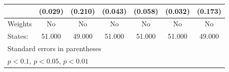{\begin{tabular}{l*{6}{c}}
            &     (0.029)         &     (0.210)         &     (0.043)         &     (0.058)         &     (0.032)         &     (0.173)         \\
\hline
Weights     &          No         &          No         &          No         &          No         &          No         &          No         \\
States:     &      51.000         &      49.000         &      51.000         &      51.000         &      51.000         &      49.000         \\
\hline\hline
\multicolumn{7}{l}{\footnotesize Standard errors in parentheses}\\
\multicolumn{7}{l}{\footnotesize \sym{*} \(p<0.1\), \sym{**} \(p<0.05\), \sym{***} \(p<0.01\)}\\
\end{tabular}
}
